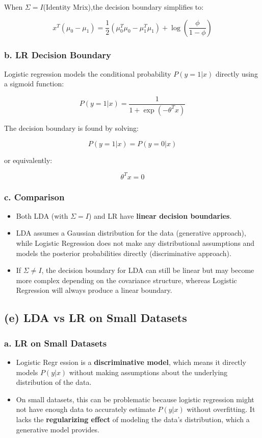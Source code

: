 \documentclass[12pt]{article}
\begin{document}
When \(\Sigma=I\)(Identity Mrix),the decision boundary simplifies to:

\[
    x^T (\mu_0 - \mu_1) = \frac{1}{2} (\mu_0^T \mu_0 - \mu_1^T \mu_1) + \log \left( \frac{\phi}{1 - \phi} \right)
\]

\subsubsection*{b. LR Decision Boundary}

Logistic regression models the conditional probability \(P(y = 1 | x)\) directly using a sigmoid function:

\[
    P(y = 1 | x) = \frac{1}{1 + \exp\left(- \theta^T x \right)}
\]

The decision boundary is found by solving:

\[
    P(y = 1 | x) = P(y = 0 | x)
\]

or equivalently:

\[
    \theta^T x = 0
\]

\subsubsection*{c. Comparison}

\begin{itemize}
    \item Both LDA (with \(\Sigma = I\)) and LR have \textbf{linear decision boundaries}.
    \item LDA assumes a Gaussian distribution for the data (generative approach), while Logistic Regression does not make any distributional assumptions and models the posterior probabilities directly (discriminative approach).
    \item If \(\Sigma \neq I\), the decision boundary for LDA can still be linear but may become more complex depending on the covariance structure, whereas Logistic Regression will always produce a linear boundary.
\end{itemize}

\subsection*{(e) LDA vs LR on Small Datasets}

\subsubsection*{a. LR on Small Datasets}

\begin{itemize}
    \item Logistic Regr ession is a \textbf{discriminative model}, which means it directly models \(P(y | x)\) without making assumptions about the underlying distribution of the data.
    \item On small datasets, this can be problematic because logistic regression might not have enough data to accurately estimate \(P(y | x)\) without overfitting. It lacks the \textbf{regularizing effect} of modeling the data's distribution, which a generative model provides.
\end{itemize}
\end{document}
